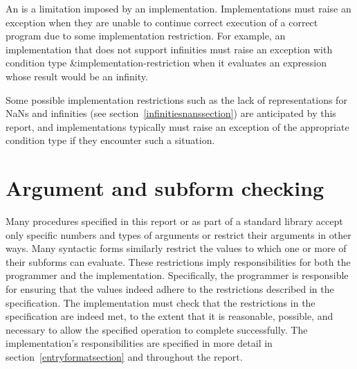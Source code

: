 An  is a limitation imposed by an
implementation.  Implementations must raise an exception
when they are unable to continue correct execution
of a correct program due to some implementation restriction.  For
example, an implementation that does not support infinities
must raise an exception with condition type
{\cf\&implementation-restriction} when it evaluates an expression
whose result would be an infinity.

Some possible implementation restrictions such as the lack of
representations for NaNs and infinities (see
section~\ref{infinitiesnanssection}) are anticipated by this report,
and implementations typically must raise an exception of the
appropriate condition type if they encounter such a situation.

\section{Argument and subform checking}
\label{argumentcheckingsection}

Many procedures specified in this report or as part of a
standard library accept only specific numbers and types of arguments
or restrict their arguments in other ways.
Many syntactic forms similarly restrict the values to which one or
more of their subforms can evaluate.
These restrictions imply responsibilities for
both the programmer and the implementation.
Specifically, the programmer is responsible for ensuring
that the values indeed adhere to the restrictions described
in the specification.  The implementation must check
that the restrictions in the specification are indeed met, to the
extent that it is reasonable, possible, and necessary to allow the
specified operation to complete successfully.  The implementation's
responsibilities are specified in more detail in
section~\ref{entryformatsection} and throughout the report.

